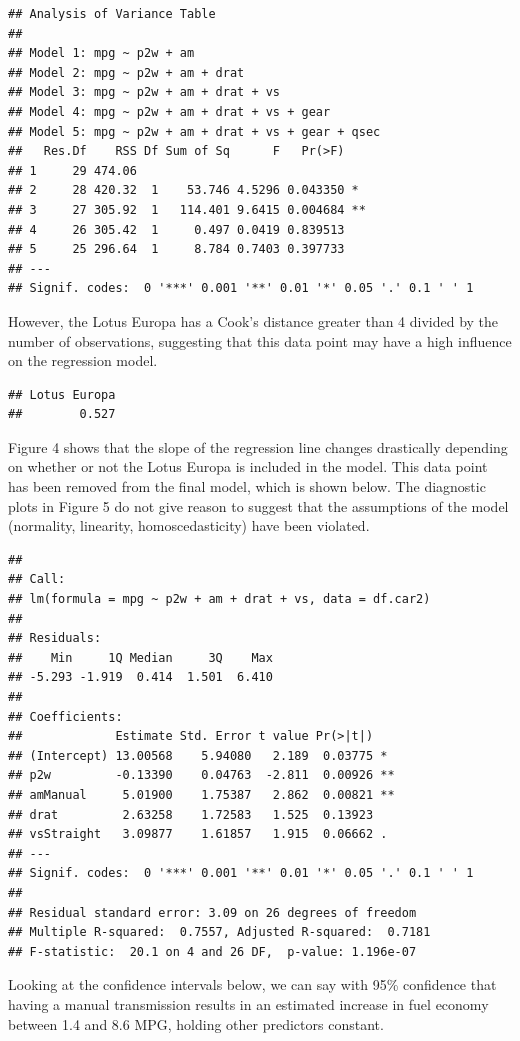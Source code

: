 \documentclass[]{article}
\begin{document}
\begin{verbatim}
## Analysis of Variance Table
## 
## Model 1: mpg ~ p2w + am
## Model 2: mpg ~ p2w + am + drat
## Model 3: mpg ~ p2w + am + drat + vs
## Model 4: mpg ~ p2w + am + drat + vs + gear
## Model 5: mpg ~ p2w + am + drat + vs + gear + qsec
##   Res.Df    RSS Df Sum of Sq      F   Pr(>F)   
## 1     29 474.06                                
## 2     28 420.32  1    53.746 4.5296 0.043350 * 
## 3     27 305.92  1   114.401 9.6415 0.004684 **
## 4     26 305.42  1     0.497 0.0419 0.839513   
## 5     25 296.64  1     8.784 0.7403 0.397733   
## ---
## Signif. codes:  0 '***' 0.001 '**' 0.01 '*' 0.05 '.' 0.1 ' ' 1
\end{verbatim}

However, the Lotus Europa has a Cook's distance greater than 4 divided
by the number of observations, suggesting that this data point may have
a high influence on the regression model.

\begin{verbatim}
## Lotus Europa 
##        0.527
\end{verbatim}

Figure 4 shows that the slope of the regression line changes drastically
depending on whether or not the Lotus Europa is included in the model.
This data point has been removed from the final model, which is shown
below. The diagnostic plots in Figure 5 do not give reason to suggest
that the assumptions of the model (normality, linearity,
homoscedasticity) have been violated.

\begin{verbatim}
## 
## Call:
## lm(formula = mpg ~ p2w + am + drat + vs, data = df.car2)
## 
## Residuals:
##    Min     1Q Median     3Q    Max 
## -5.293 -1.919  0.414  1.501  6.410 
## 
## Coefficients:
##             Estimate Std. Error t value Pr(>|t|)   
## (Intercept) 13.00568    5.94080   2.189  0.03775 * 
## p2w         -0.13390    0.04763  -2.811  0.00926 **
## amManual     5.01900    1.75387   2.862  0.00821 **
## drat         2.63258    1.72583   1.525  0.13923   
## vsStraight   3.09877    1.61857   1.915  0.06662 . 
## ---
## Signif. codes:  0 '***' 0.001 '**' 0.01 '*' 0.05 '.' 0.1 ' ' 1
## 
## Residual standard error: 3.09 on 26 degrees of freedom
## Multiple R-squared:  0.7557, Adjusted R-squared:  0.7181 
## F-statistic:  20.1 on 4 and 26 DF,  p-value: 1.196e-07
\end{verbatim}

Looking at the confidence intervals below, we can say with 95\%
confidence that having a manual transmission results in an estimated
increase in fuel economy between 1.4 and 8.6 MPG, holding other
predictors constant.
\end{document}
